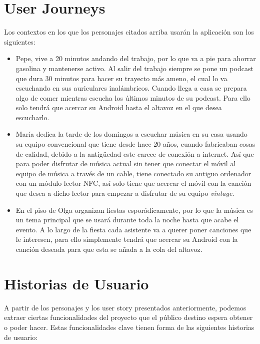 \section{User Journeys}
Los contextos en los que los personajes citados arriba usarán la aplicación son
los siguientes:\\

\begin{itemize}
    \item Pepe, vive a 20 minutos andando del trabajo, por lo que va a
    pie para ahorrar gasolina y mantenerse activo. Al salir del trabajo siempre
    se pone un podcast que dura 30 minutos para hacer su trayecto más ameno, el
    cual lo va escuchando en sus auriculares inalámbricos. Cuando llega a casa
    se prepara algo de comer mientras escucha los últimos minutos de su podcast.
    Para ello solo tendrá que acercar su Android hasta el altavoz en el que
    desea escucharlo.
    \item María dedica la tarde de los domingos a escuchar música en su casa
    usando su equipo convencional que tiene desde hace 20 años, cuando
    fabricaban cosas de calidad, debido a la antigüedad este carece de conexión
    a internet. Así que para poder disfrutar de música actual sin tener que
    conectar el móvil al equipo de música a través de un cable, tiene conectado
    su antiguo ordenador con un módulo lector NFC, así solo tiene que acercar el
    móvil con la canción que desea a dicho lector para empezar a disfrutar de su
    equipo \emph{vintage}.
    \item En el piso de Olga organizan fiestas esporádicamente, por lo que la
    música es un tema principal que se usará durante toda la noche hasta que
    acabe el evento. A lo largo de la fiesta cada asistente va a querer poner
    canciones que le interesen, para ello simplemente tendrá que acercar su
    Android con la canción deseada para que esta se añada a la cola del altavoz.
\end{itemize}


\section{Historias de Usuario}
A partir de los personajes y los user story presentados anteriormente, podemos
extraer ciertas funcionalidades del proyecto que el público destino espera
obtener o poder hacer. Estas funcionalidades clave tienen forma de las
siguientes historias de usuario:

